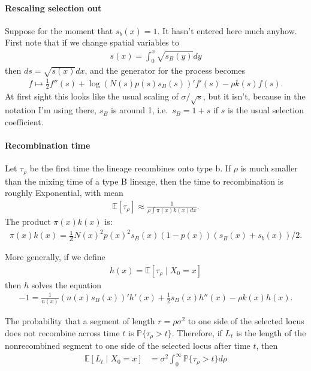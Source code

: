 \documentclass{article}
\newcommand{\E}{\mathbb{E}}
\renewcommand{\P}{\mathbb{P}}
\newcommand{\given}{\;\vert\;}
\begin{document}
\paragraph{Rescaling selection out}
Suppose for the moment that $s_b(x)=1$. 
It hasn't entered here much anyhow.
First note that if we change spatial variables to
\begin{align}
  s(x) = \int_0^x \sqrt{s_B(y)} dy
\end{align}
then $ds = \sqrt{s(x)} dx$, and the generator for the process becomes
\begin{align}
  f \mapsto 
    \frac{1}{2} f''(s) + \log\left( N(s) p(s) s_B(s) \right)' f'(s) - \rho k(s) f(s) .
\end{align}
At first sight this looks like the usual scaling of $\sigma/\sqrt{s}$,
but it isn't, because in the notation I'm using there, $s_B$ is around 1,
i.e.\ $s_B = 1+s$ if $s$ is the usual selection coefficient.


\paragraph{Recombination time}
Let $\tau_\rho$ be the first time  the lineage recombines onto type b.
If $\rho$ is much smaller than the mixing time of a type B lineage,
then the time to recombination is roughly Exponential,
with mean
\begin{align}
    \E[\tau_\rho] \approx \frac{1}{ \rho \int \pi(x) k(x) dx } .
\end{align}
The product $\pi(x) k(x)$ is:
\begin{align}
    \pi(x) k(x) = \frac{1}{Z} N(x)^2 p(x)^2 s_B(x) (1-p(x)) (s_B(x)+s_b(x))/2 .
\end{align}

More generally, if we define
\begin{align}
    h(x) = \E[\tau_\rho \given X_0 = x]
\end{align}
then $h$ solves the equation
\begin{align}
  -1 = \frac{1}{n(x)}(n(x)s_B(x))' h'(x) + \frac{1}{2} s_B(x) h''(x) - \rho k(x) h(x) .
\end{align}

The probability that a segment of length $r = \rho \sigma^2$ to one side of the selected locus
does not recombine across time $t$ is $\P\{\tau_\rho > t\}$.
Therefore, if $L_t$ is the length of the nonrecombined segment to one side of the selected locus
after time $t$, then
\begin{align}
    \E[ L_t \given X_0=x ] &= \sigma^2 \int_0^\infty \P\{ \tau_\rho > t \} d\rho \\
\end{align}
\end{document}
